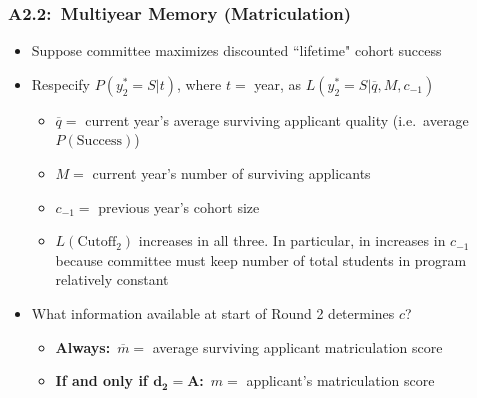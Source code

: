 \documentclass[12pt, aspectratio=169]{beamer}
\begin{document}
\begin{frame}[label=mmm]
\frametitle{A2.2:\ Multiyear Memory (Matriculation)}
\begin{itemize}
\item Suppose committee maximizes discounted ``lifetime" cohort success
\vspace{10pt}
\item Respecify $P(y_2^*=S|t)$, where $t=$ year, as $L(y_2^*=S|\overline{q},M,c_{-1})$
\vspace{5pt}
\begin{itemize}
\item $\overline{q}=$ current year's average surviving applicant quality (i.e.\ average $P(\text{Success})$)
\vspace{5pt}
\item $M=$ current year's number of surviving applicants
\vspace{5pt}
\item $c_{-1}=$ previous year's cohort size
\vspace{5pt}
\item $L(\text{Cutoff}_2)$ increases in all three. In particular, in increases in $c_{-1}$ because committee must keep number of total students in program relatively constant
\vspace{10pt}
\end{itemize}
\item What information available at start of Round 2 determines $c$?
\vspace{5pt}
\begin{itemize}
\item \textbf{Always:}\ $\overline{m}=$ average surviving applicant matriculation score
\vspace{5pt}
\item \textbf{If and only if $\boldsymbol{d_2=A}$:}\ $m=$ applicant's matriculation score
\vspace{5pt}
\end{itemize}
\end{itemize}
\hyperlink{conc}{}
\end{frame}
\end{document}

